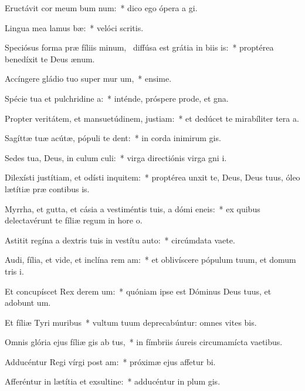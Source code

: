 \item Eructávit cor meum bum num:~* dico ego ópera a gi.
\item Lingua mea lamus bæ:~* velóci scritis.
\item Speciósus forma præ fíliis minum,~\pscross{} diffúsa est grátia in biis is:~* proptérea benedíxit te Deus  ænum.
\item Accíngere gládio tuo super mur um,~* ensime.
\item Spécie tua et pulchridine a:~* inténde, próspere prode, et gna.
\item Propter veritátem, et mansuetúdinem,  justiam:~* et dedúcet te mirabíliter tera a.
\item Sagíttæ tuæ acútæ, pópuli  te dent:~* in corda inimirum gis.
\item Sedes tua, Deus, in culum culi:~* virga directiónis virga gni i.
\item Dilexísti justítiam, et odísti inquitem:~* proptérea unxit te, Deus, Deus tuus, óleo lætítiæ præ contibus is.
\item Myrrha, et gutta, et cásia a vestiméntis tuis, a dómi eneis:~* ex quibus delectavérunt te fíliæ regum in hore o.
\item Astitit regína a dextris tuis in vestítu auto:~* circúmdata vaete.
\item Audi, fília, et vide, et inclína rem am:~* et oblivíscere pópulum tuum, et domum tris i.
\item Et concupíscet Rex derem um:~* quóniam ipse est Dóminus Deus tuus, et adobunt um.
\item Et fíliæ Tyri  muribus~* vultum tuum deprecabúntur: omnes vites bis.
\item Omnis glória ejus fíliæ gis ab tus,~* in fímbriis áureis circumamícta vaetibus.
\item Adducéntur Regi vírgi post am:~* próximæ ejus affetur bi.
\item Afferéntur in lætítia et exsultine:~* adducéntur in plum gis.
